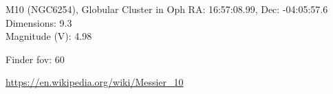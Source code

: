 \begin{block}{M10 (NGC6254), Globular Cluster in Oph}
    RA: 16:57:08.99, Dec: -04:05:57.6 \\ 
    Dimensions: 9.3 \\ 
    Magnitude (V): 4.98



    Finder fov: 60 

    \url{https://en.wikipedia.org/wiki/Messier_10} 
\end{block}